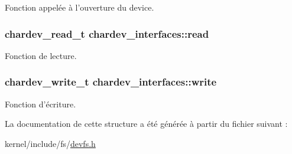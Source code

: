 Fonction appelée à l'ouverture du device. \hypertarget{structchardev__interfaces_afeba560360e6a5dfff549d78c220b68b}{
\subsubsection[{read}]{\setlength{\rightskip}{0pt plus 5cm}chardev\+\_\+read\+\_\+t chardev\+\_\+interfaces\+::read}}\label{structchardev__interfaces_afeba560360e6a5dfff549d78c220b68b}
Fonction de lecture. \hypertarget{structchardev__interfaces_a6f70961f2f888de24d500d50bae85a3f}{
\subsubsection[{write}]{\setlength{\rightskip}{0pt plus 5cm}chardev\+\_\+write\+\_\+t chardev\+\_\+interfaces\+::write}}\label{structchardev__interfaces_a6f70961f2f888de24d500d50bae85a3f}
Fonction d'écriture. 

La documentation de cette structure a été générée à partir du fichier suivant \+:\begin{DoxyCompactItemize}
\item 
kernel/include/fs/\hyperlink{devfs_8h}{devfs.\+h}\end{DoxyCompactItemize}
